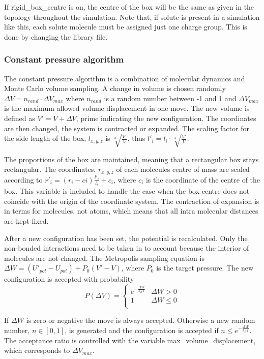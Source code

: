 \documentclass[a4paper,11pt]{article}
\begin{document}
If rigid\_box\_centre is on, the centre of the box will be the
same as given in the topology throughout the simulation. Note
that, if solute is present in a simulation like this, each solute
molecule must be assigned just one charge group. This is done by
changing the library file.

\subsubsection{Constant pressure algorithm}
The constant pressure algorithm is a combination of molecular
dynamics and Monte Carlo volume sampling. A change in volume is
chosen randomly $\Delta V = n_{rand}\cdot\Delta V_{max}$ where
$n_{rand}$ is a random number between -1 and 1 and $\Delta
V_{max}$ is the maximum allowed volume displacement in one move.
The new volume is defined as $V' = V + \Delta V$, prime indicating
the new configuration. The coordinates are then changed, the
system is contracted or expanded. The scaling factor for the side
length of the box, $l_{x,y,z}$ is $\sqrt[3]{\frac{V'}{V}}$, thus
$l'_{i}=l_{i}\cdot\sqrt[3]{\frac{V'}{V}}$.

The proportions of the box are maintained, meaning that a
rectangular box stays rectangular. The coordinates, $r_{x,y,z}$ of
each molecules centre of mass are scaled according to $r'_{i} =
(r_{i}-c{i})\frac{l'_{i}}{l_{i}}+c_{i}$, where $c_i$ is the
coordinate of the centre of the box. This variable is included to
handle the case when the box centre does not coincide with the
origin of the coordinate system. The contraction of expansion is
in terms for molecules, not atoms, which means that all intra
molecular distances are kept fixed.

After a new configuration has been set, the potential is
recalculated. Only the non-bonded interactions need to be taken in
to account because the interior of molecules are not changed. The
Metropolis sampling equation is $\Delta W = (U'_{pot} - U_{pot}) +
P_{0}(V'-V)$, where $P_0$ is the target pressure. The new
configuration is accepted with probability
\begin {equation}
 P(\Delta V) = \begin{cases}
    e^{-\frac{\Delta W}{k_{B}T}} & \Delta W > 0 \\
    1 & \Delta W \leq 0\\
  \end{cases}
\end{equation}

If $\Delta W$ is zero or negative the move is always accepted.
Otherwise a new random number, $n \in [0,1]$, is generated and the
configuration is accepted if $n \leq e^{-\frac{\Delta
W}{k_{B}T}}$. The acceptance ratio is controlled with the variable
max\_volume\_displacement, which corresponds to $\Delta V_{max}$.
\end{document}
